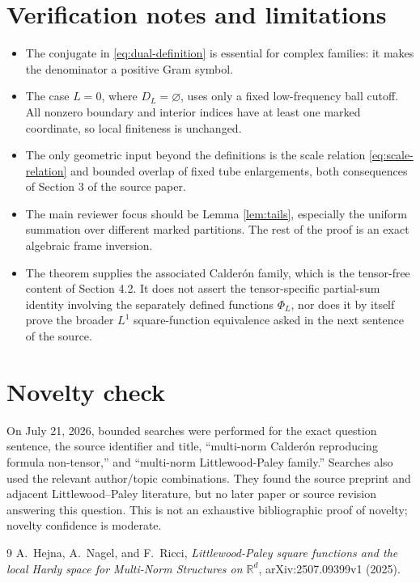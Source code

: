 \documentclass[11pt]{article}
\begin{document}
\section*{Verification notes and limitations}

\begin{itemize}
\item The conjugate in \eqref{eq:dual-definition} is essential for complex
families: it makes the denominator a positive Gram symbol.
\item The case $L=0$, where $D_L=\varnothing$, uses only a fixed low-frequency
ball cutoff.  All nonzero boundary and interior indices have at least one
marked coordinate, so local finiteness is unchanged.
\item The only geometric input beyond the definitions is the scale relation
\eqref{eq:scale-relation} and bounded overlap of fixed tube enlargements,
both consequences of Section 3 of the source paper.
\item The main reviewer focus should be Lemma \ref{lem:tails}, especially the
uniform summation over different marked partitions.  The rest of the proof is
an exact algebraic frame inversion.
\item The theorem supplies the associated Calder\'on family, which is the
tensor-free content of Section 4.2.  It does not assert the tensor-specific
partial-sum identity involving the separately defined functions $\Phi_L$, nor
does it by itself prove the broader $L^1$ square-function equivalence asked in
the next sentence of the source.
\end{itemize}

\section*{Novelty check}

On July 21, 2026, bounded searches were performed for the exact question
sentence, the source identifier and title, ``multi-norm Calder\'on reproducing
formula non-tensor,'' and ``multi-norm Littlewood-Paley family.''  Searches
also used the relevant author/topic combinations.  They found the source preprint and adjacent
Littlewood--Paley literature, but no later paper or source revision answering
this question.  This is not an exhaustive bibliographic proof of novelty;
novelty confidence is moderate.

\begin{thebibliography}{9}
A.~Hejna, A.~Nagel, and F.~Ricci,
\emph{Littlewood-Paley square functions and the local Hardy space for
Multi-Norm Structures on $\mathbb R^d$}, arXiv:2507.09399v1 (2025).
\end{thebibliography}
\end{document}
